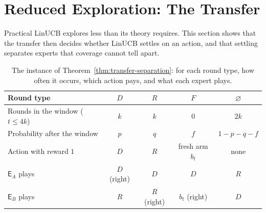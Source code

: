 \documentclass[anon]{alt2027} %
\newif\ifrevmarks\revmarkstrue
\newenvironment{revised}{\ifrevmarks\color{revcolor}\fi}{}
\newcommand{\Exp}{\mathsf{E}}
\begin{document}
\section{Reduced Exploration: The Transfer}
\label{sec:two-channels}

\begin{revised}
Practical LinUCB explores less than its theory requires. This section shows
that the transfer then decides whether LinUCB settles on an action, and
that settling separates experts that coverage cannot tell apart.
\end{revised}

\begin{table}[t]
\centering
\caption{The instance of Theorem~\ref{thm:transfer-separation}: for each round
type, how often it occurs, which action pays, and what each expert plays.}
\label{tab:instance}
\small
\begin{tabular}{@{}lcccc@{}}
\toprule
Round type & $D$ & $R$ & $F$ & $\varnothing$\\
\midrule
Rounds in the window ($t\le4k$) & $k$ & $k$ & $0$ & $2k$\\
Probability after the window & $p$ & $q$ & $f$ & $1-p-q-f$\\
Action with reward $1$ & $D$ & $R$ & fresh arm $b_t$ & none\\
$\Exp_A$ plays & $D$ (right) & $D$ & $D$ & $R$\\
$\Exp_B$ plays & $R$ & $R$ (right) & $b_t$ (right) & $D$\\
\bottomrule
\end{tabular}
\end{table}
\end{document}
